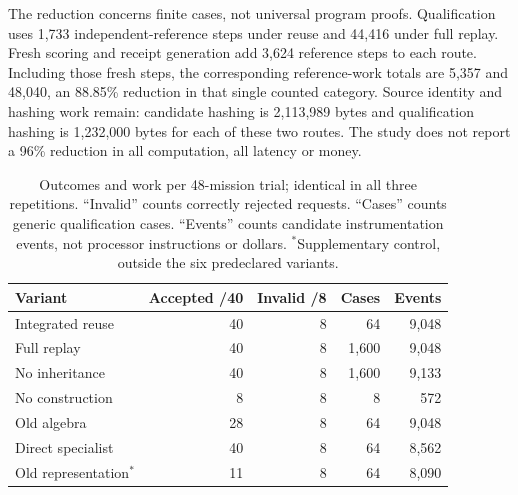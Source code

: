 \documentclass[11pt]{article}
\begin{document}
The reduction concerns finite cases, not universal program proofs. Qualification uses 1,733 independent-reference steps under reuse and 44,416 under full replay. Fresh scoring and receipt generation add 3,624 reference steps to each route. Including those fresh steps, the corresponding reference-work totals are 5,357 and 48,040, an 88.85\% reduction in that single counted category. Source identity and hashing work remain: candidate hashing is 2,113,989 bytes and qualification hashing is 1,232,000 bytes for each of these two routes. The study does not report a 96\% reduction in all computation, all latency or money.

\begin{table}[htbp]
\centering
\small
\begin{tabularx}{\linewidth}{Yrrrr}
\toprule
\textbf{Variant} & \textbf{Accepted /40} & \textbf{Invalid /8} & \textbf{Cases} & \textbf{Events}\\
\midrule
Integrated reuse & 40 & 8 & 64 & 9,048\\
Full replay & 40 & 8 & 1,600 & 9,048\\
No inheritance & 40 & 8 & 1,600 & 9,133\\
No construction & 8 & 8 & 8 & 572\\
Old algebra & 28 & 8 & 64 & 9,048\\
Direct specialist & 40 & 8 & 64 & 8,562\\
Old representation$^*$ & 11 & 8 & 64 & 8,090\\
\bottomrule
\end{tabularx}
\caption{Outcomes and work per 48-mission trial; identical in all three repetitions. ``Invalid'' counts correctly rejected requests. ``Cases'' counts generic qualification cases. ``Events'' counts candidate instrumentation events, not processor instructions or dollars. $^*$Supplementary control, outside the six predeclared variants.}
\label{tab:outcomes}
\end{table}
\end{document}
